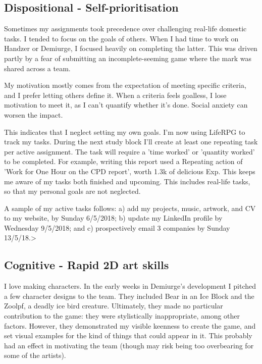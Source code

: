 \documentclass{scrartcl}
\begin{document}
\subsection{Dispositional - Self-prioritisation} %
Sometimes my assignments took precedence over challenging real-life domestic tasks. I tended to focus on the goals of others. When I had time to work on Handzer or Demiurge, I focused heavily on completing the latter. This was driven partly by a fear of submitting an incomplete-seeming game where the mark was shared across a team.

My motivation mostly comes from the expectation of meeting specific criteria, and I prefer letting others define it. When a criteria feels goalless, I lose motivation to meet it, as I can't quantify whether it's done. Social anxiety can worsen the impact.

This indicates that I neglect setting my own goals. I'm now using LifeRPG to track my tasks. During the next study block I'll create at least one repeating task per active assignment. The task will require a 'time worked' or 'quantity worked' to be completed. For example, writing this report used a Repeating action of 'Work for One Hour on the CPD report', worth 1.3k of delicious Exp. This keeps me aware of my tasks both finished and upcoming. This includes real-life tasks, so that my personal goals are not neglected.

A sample of my active tasks follows: a) add my projects, music, artwork, and CV to my website, by Sunday 6/5/2018; b) update my LinkedIn profile by Wednesday 9/5/2018; and c) prospectively email 3 companies by Sunday 13/5/18.>


\subsection{Cognitive - Rapid 2D art skills} %
I love making characters. In the early weeks in Demiurge's development I pitched a few character designs to the team. They included Bear in an Ice Block and the Zoolpf, a deadly ice bird creature. Ultimately, they made no particular contribution to the game: they were stylistically inappropriate, among other factors. However, they demonstrated my visible keenness to create the game, and set visual examples for the kind of things that could appear in it. This probably had an effect in motivating the team (though may risk being too overbearing for some of the artists).
\end{document}
